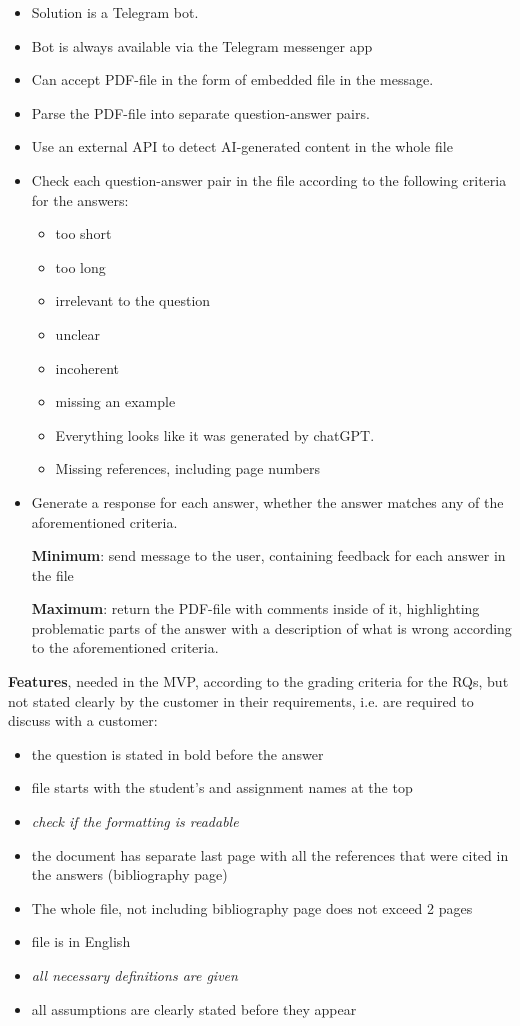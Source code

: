 \documentclass{article}
\begin{document}
\begin{itemize}
    \item Solution is a Telegram bot.
    \item Bot is always available via the Telegram messenger app
    \item Can accept PDF-file in the form of embedded file in the message.
    \item Parse the PDF-file into separate question-answer pairs.
    \item Use an external API to detect AI-generated content in the whole file
    \item Check each question-answer pair in the file according to the following criteria for the answers:
    \begin{itemize}
        \item too short
        \item too long
        \item irrelevant to the question
        \item unclear
        \item incoherent
        \item missing an example
        \item Everything looks like it was generated by chatGPT.
        \item Missing references, including page numbers
    \end{itemize}    
    \item Generate a response for each answer, whether the answer matches any of the aforementioned criteria. 
        
        \textbf{Minimum}: send message to the user, containing feedback for each answer in the file
        
        \textbf{Maximum}: return the PDF-file with comments inside of it, highlighting problematic parts of the answer with a description of what is wrong according to the aforementioned criteria.
\end{itemize}
\textbf{Features}, needed in the MVP, according to the grading criteria for the RQs, but not stated clearly by the customer in their requirements, i.e. are required to discuss with a customer:
    \begin{itemize}
        \item the question is stated in bold before the answer
        \item file starts with the student's and assignment names at the top
        \item \textit{check if the formatting is readable}
        \item the document has separate last page with all the references that were cited in the answers (bibliography page)
        \item The whole file, not including bibliography page does not exceed 2 pages
        \item file is in English
        \item \textit{all necessary definitions are given}
        \item all assumptions are clearly stated before they appear
    \end{itemize}
    
\end{document}

